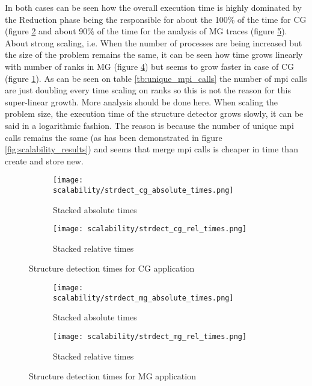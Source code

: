 In both cases can be seen how the overall execution time is highly dominated
by the Reduction phase being the responsible for about the 100\% of the time for
CG (figure \ref{fig:cg_stdrec_rel} and about 90\% of the time for the analysis
of MG traces (figure \ref{fig:mg_stdrec_rel}). 
About strong scaling, i.e. When the number of processes are being
increased but the size of the problem remains the same, it can be seen
how time grows linearly with number of ranks in MG
(figure \ref{fig:mg_strdec_abs}) but seems to grow faster in case of CG (figure
\ref{fig:cg_strdec_abs}). As can be seen on table \ref{tb:unique_mpi_calls} the
number of mpi calls are just doubling every time scaling on ranks so this is not
the reason for this super-linear growth. More analysis should be done here.
When scaling the problem size, the execution time of the
structure detector grows slowly, it can be said in a logarithmic fashion. The
reason is because the number of unique mpi calls remains the same (as
has been demonstrated in figure \ref{fig:scalability_results}) and seems that
merge mpi calls is cheaper in time than create and store new.

\begin{figure}
    \centering
    \begin{subfigure}[b]{0.6\textwidth}
        \texttt{[image: scalability/strdect\_cg\_absolute\_times.png]}
        \caption{Stacked absolute times}
        \label{fig:cg_strdec_abs}
    \end{subfigure}
    \medspace
    \begin{subfigure}[b]{0.6\textwidth}
        \texttt{[image: scalability/strdect\_cg\_rel\_times.png]}
        \caption{Stacked relative times}
        \label{fig:cg_stdrec_rel}
    \end{subfigure}
    \caption{Structure detection times for CG application}
    \label{fig:scalability_results_cg}
\end{figure}

\begin{figure}
    \centering
    \begin{subfigure}[b]{0.6\textwidth}
        \texttt{[image: scalability/strdect\_mg\_absolute\_times.png]}
        \caption{Stacked absolute times}
        \label{fig:mg_strdec_abs}
    \end{subfigure}
    \medspace
    \begin{subfigure}[b]{0.6\textwidth}
        \texttt{[image: scalability/strdect\_mg\_rel\_times.png]}
        \caption{Stacked relative times}
        \label{fig:mg_stdrec_rel}
    \end{subfigure}
    \caption{Structure detection times for MG application}
    \label{fig:scalability_results_mg}
\end{figure}
